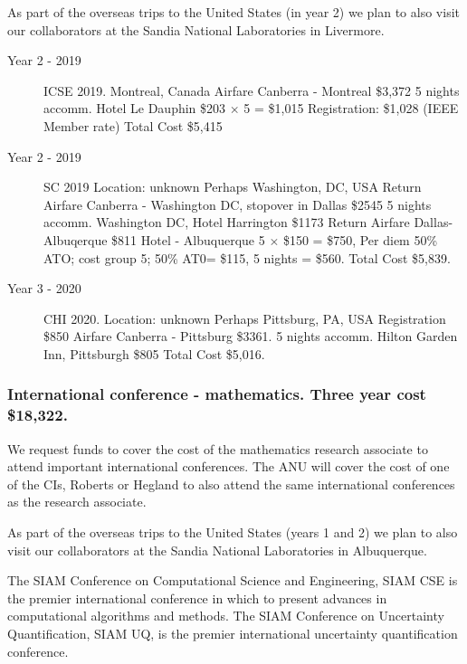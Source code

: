 \documentclass[a4paper,twoside,12pt,compact]{article}
\begin{document}
As part of the overseas trips to the United States (in year 2) we plan to also visit our collaborators at the Sandia National Laboratories in Livermore. 




\begin{description}


\item[Year 2 - 2019] ICSE 2019.
Montreal, Canada
Airfare Canberra - Montreal \$3,372
5 nights accomm. Hotel Le Dauphin \$203 $\times$ 5 = \$1,015
Registration: \$1,028 (IEEE Member rate)
Total Cost \$5,415

\item[Year 2 - 2019] SC 2019
Location: unknown
Perhaps Washington, DC, USA
Return Airfare Canberra - Washington DC, stopover in Dallas  \$2545
5 nights accomm. Washington DC, Hotel Harrington \$1173
Return Airfare Dallas-Albuqerque \$811
Hotel - Albuquerque 5 $\times$  \$150 = \$750,
Per diem 50\% ATO; cost group 5; 50\% AT0= \$115, 5 nights = \$560. Total Cost \$5,839.

\item[Year 3 - 2020] CHI 2020.
Location: unknown 
Perhaps Pittsburg, PA, USA
Registration \$850 
Airfare Canberra - Pittsburg \$3361. 
5 nights accomm. Hilton Garden Inn, Pittsburgh \$805 
Total Cost \$5,016.



\end{description}


\subsubsection*{International conference - mathematics. Three year cost \$18,322.}


We request funds to cover the cost of the mathematics research associate to attend important international conferences.  The ANU will cover the cost of one of the CIs, Roberts or Hegland to also attend the same international conferences as the research associate. 

As part of the overseas trips to the United States (years 1 and 2) we plan to also visit our collaborators at the Sandia National Laboratories in Albuquerque. 

The SIAM Conference on Computational Science and Engineering, SIAM CSE is the premier international conference in which to present advances in computational algorithms and methods. The SIAM Conference on Uncertainty Quantification, SIAM UQ, is the premier international uncertainty quantification conference.
\end{document}
